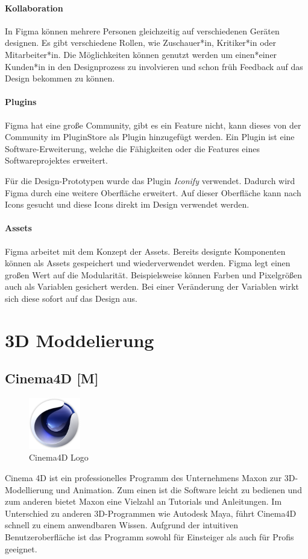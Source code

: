 \paragraph{Kollaboration}
In Figma können mehrere Personen gleichzeitig auf verschiedenen Geräten designen. Es gibt verschiedene Rollen, wie Zuschauer*in, Kritiker*in oder Mitarbeiter*in. Die Möglichkeiten können genutzt werden um einen*einer Kunden*in in den Designprozess zu involvieren und schon früh Feedback auf das Design bekommen zu können.

\paragraph{Plugins}
Figma hat eine große Community, gibt es ein Feature nicht, kann dieses von der Community im PluginStore als Plugin hinzugefügt werden. Ein Plugin ist eine Software-Erweiterung, welche die Fähigkeiten oder die Features eines Softwareprojektes erweitert.

Für die Design-Prototypen wurde das Plugin \emph{Iconify} verwendet. Dadurch wird  Figma durch eine weitere Oberfläche erweitert. Auf dieser Oberfläche kann nach Icons gesucht und diese Icons direkt im Design verwendet werden.

\paragraph{Assets}
Figma arbeitet mit dem Konzept der Assets. Bereits designte Komponenten können als Assets gespeichert und wiederverwendet werden. Figma legt einen großen Wert auf die Modularität. Beispielsweise können Farben und Pixelgrößen auch als Variablen gesichert werden. Bei einer Veränderung der Variablen wirkt sich diese sofort auf das Design aus.

\section{3D Moddelierung}
\subsection{Cinema4D [M]}
\begin{figure}
  \begin{center}
    \includegraphics[width=0.2\textwidth]{pics/cinema4d_logo.png}
   \caption{Cinema4D Logo}
  \end{center}
\end{figure}
Cinema 4D ist ein professionelles Programm des Unternehmens Maxon zur 3D-Modellierung und Animation. Zum einen ist die Software leicht zu bedienen und zum anderen bietet Maxon eine Vielzahl an Tutorials und Anleitungen. Im Unterschied zu anderen 3D-Programmen wie Autodesk Maya, führt Cinema4D schnell zu einem anwendbaren Wissen. Aufgrund der intuitiven Benutzeroberfläche ist das Programm sowohl für Einsteiger als auch für Profis geeignet. \cite{Cinema4D}

